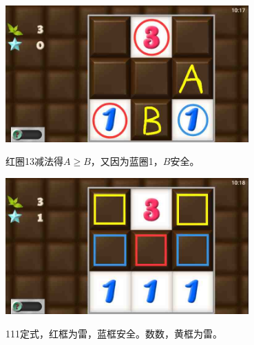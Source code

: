 \subsection{} %
\begin{center}
    \includegraphics[width=0.7\textwidth]{puzzlelow/18-1.jpg}
\end{center}
红圈13减法得$A\ge B$，又因为蓝圈1，$B$安全。
\begin{center}
    \includegraphics[width=0.7\textwidth]{puzzlelow/18-2.jpg}
\end{center}
111定式，红框为雷，蓝框安全。数数，黄框为雷。

